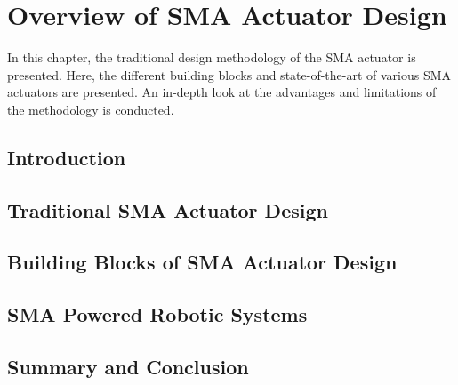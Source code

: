 
\chapter{Overview of SMA Actuator Design}\label{chap:sma-actuator-design}
In this chapter, the traditional design methodology of the SMA actuator is presented. Here, the different building blocks and state-of-the-art of various SMA actuators are presented. An in-depth look at the advantages and limitations of the methodology is conducted.
\section{Introduction}
\section{Traditional SMA Actuator Design}
\section{Building Blocks of SMA Actuator Design}
\section{SMA Powered Robotic Systems}
\section{Summary and Conclusion}
